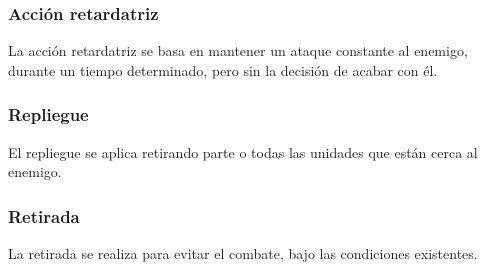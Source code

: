 \subsubsection{Acción retardatriz}
La acción retardatriz se basa en mantener un ataque constante al enemigo, durante un tiempo determinado, pero sin la decisión de acabar con él.

\subsubsection{Repliegue}
El repliegue se aplica retirando parte o todas las unidades que están cerca al enemigo.

\subsubsection{Retirada}
La retirada se realiza para evitar el combate, bajo las condiciones existentes.

